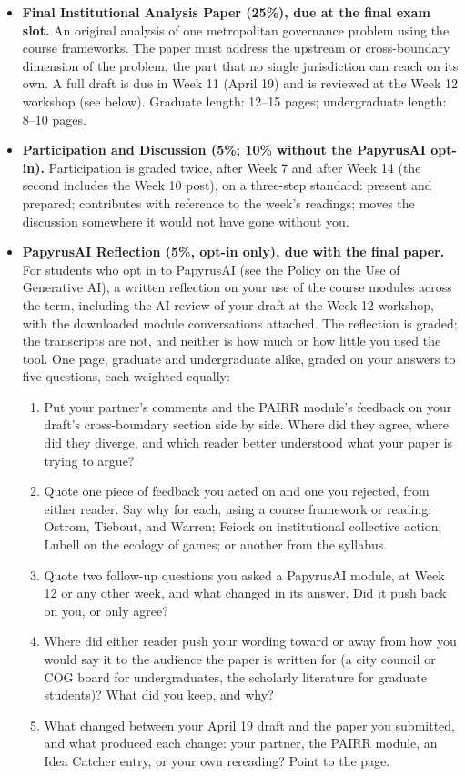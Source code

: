\documentclass[12pt]{article}
\begin{document}
\begin{itemize}
    \item \textbf{Final Institutional Analysis Paper (25\%), due at the final exam slot.} An original analysis of one metropolitan governance problem using the course frameworks. The paper must address the upstream or cross-boundary dimension of the problem, the part that no single jurisdiction can reach on its own. A full draft is due in Week 11 (April 19) and is reviewed at the Week 12 workshop (see below). Graduate length: 12--15 pages; undergraduate length: 8--10 pages.
    \item \textbf{Participation and Discussion (5\%; 10\% without the PapyrusAI opt-in).} Participation is graded twice, after Week 7 and after Week 14 (the second includes the Week 10 post), on a three-step standard: present and prepared; contributes with reference to the week's readings; moves the discussion somewhere it would not have gone without you.
    \item \textbf{PapyrusAI Reflection (5\%, opt-in only), due with the final paper.} For students who opt in to PapyrusAI (see the Policy on the Use of Generative AI), a written reflection on your use of the course modules across the term, including the AI review of your draft at the Week 12 workshop, with the downloaded module conversations attached. The reflection is graded; the transcripts are not, and neither is how much or how little you used the tool. One page, graduate and undergraduate alike, graded on your answers to five questions, each weighted equally:
    \begin{enumerate}
        \item Put your partner's comments and the PAIRR module's feedback on your draft's cross-boundary section side by side. Where did they agree, where did they diverge, and which reader better understood what your paper is trying to argue?
        \item Quote one piece of feedback you acted on and one you rejected, from either reader. Say why for each, using a course framework or reading: Ostrom, Tiebout, and Warren; Feiock on institutional collective action; Lubell on the ecology of games; or another from the syllabus.
        \item Quote two follow-up questions you asked a PapyrusAI module, at Week 12 or any other week, and what changed in its answer. Did it push back on you, or only agree?
        \item Where did either reader push your wording toward or away from how you would say it to the audience the paper is written for (a city council or COG board for undergraduates, the scholarly literature for graduate students)? What did you keep, and why?
        \item What changed between your April 19 draft and the paper you submitted, and what produced each change: your partner, the PAIRR module, an Idea Catcher entry, or your own rereading? Point to the page.
    \end{enumerate}
\end{itemize}
\end{document}
